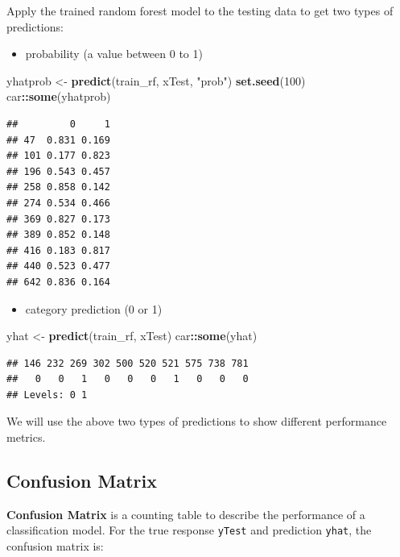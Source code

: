 \documentclass[12pt,]{krantz}
\makeatletter
\newenvironment{Shaded}{\begin{snugshade}}{\end{snugshade}}
\newcommand{\DecValTok}[1]{\textcolor[rgb]{0.06,0.06,0.06}{#1}}
\newcommand{\KeywordTok}[1]{\textcolor[rgb]{0.27,0.27,0.27}{\textbf{#1}}}
\newcommand{\NormalTok}[1]{#1}
\newcommand{\OperatorTok}[1]{\textcolor[rgb]{0.43,0.43,0.43}{\textbf{#1}}}
\newcommand{\StringTok}[1]{\textcolor[rgb]{0.5,0.5,0.5}{#1}}
\providecommand{\tightlist}{%
  \setlength{\itemsep}{0pt}\setlength{\parskip}{0pt}}
\newenvironment{kframe}{%
\medskip{}
\setlength{\fboxsep}{.8em}
 \def\at@end@of@kframe{}%
 \ifinner\ifhmode%
  \def\at@end@of@kframe{\end{minipage}}%
  \begin{minipage}{\columnwidth}%
 \fi\fi%
 \def\FrameCommand##1{\hskip\@totalleftmargin \hskip-\fboxsep
 \colorbox{shadecolor}{##1}\hskip-\fboxsep
     \hskip-\linewidth \hskip-\@totalleftmargin \hskip\columnwidth}%
 \MakeFramed {\advance\hsize-\width
   \@totalleftmargin\z@ \linewidth\hsize
   \@setminipage}}%
 {\par\unskip\endMakeFramed%
 \at@end@of@kframe}
\renewenvironment{Shaded}{\begin{kframe}}{\end{kframe}}
\makeatother
\begin{document}
Apply the trained random forest model to the testing data to get two types of predictions:

\begin{itemize}
\tightlist
\item
  probability (a value between 0 to 1)
\end{itemize}

\begin{Shaded}
\begin{Highlighting}[]
\NormalTok{yhatprob <-}\StringTok{ }\KeywordTok{predict}\NormalTok{(train_rf, xTest, }\StringTok{"prob"}\NormalTok{)}
\KeywordTok{set.seed}\NormalTok{(}\DecValTok{100}\NormalTok{)}
\NormalTok{car}\OperatorTok{::}\KeywordTok{some}\NormalTok{(yhatprob)}
\end{Highlighting}
\end{Shaded}

\begin{verbatim}
##         0     1
## 47  0.831 0.169
## 101 0.177 0.823
## 196 0.543 0.457
## 258 0.858 0.142
## 274 0.534 0.466
## 369 0.827 0.173
## 389 0.852 0.148
## 416 0.183 0.817
## 440 0.523 0.477
## 642 0.836 0.164
\end{verbatim}

\begin{itemize}
\tightlist
\item
  category prediction (0 or 1)
\end{itemize}

\begin{Shaded}
\begin{Highlighting}[]
\NormalTok{yhat <-}\StringTok{ }\KeywordTok{predict}\NormalTok{(train_rf, xTest)}
\NormalTok{car}\OperatorTok{::}\KeywordTok{some}\NormalTok{(yhat)}
\end{Highlighting}
\end{Shaded}

\begin{verbatim}
## 146 232 269 302 500 520 521 575 738 781 
##   0   0   1   0   0   0   1   0   0   0 
## Levels: 0 1
\end{verbatim}

We will use the above two types of predictions to show different performance metrics.

\hypertarget{confusion-matrix}{%
\subsection{Confusion Matrix}\label{confusion-matrix}}

\textbf{Confusion Matrix} is a counting table to describe the performance of a classification model. For the true response \texttt{yTest} and prediction \texttt{yhat}, the confusion matrix is:
\end{document}
